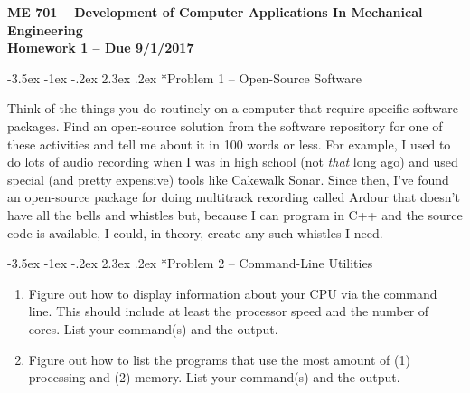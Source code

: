 \documentclass[11pt]{article}
\makeatletter
\renewcommand\section{\@startsection{section}{1}{\z@}%
                                  {-3.5ex \@plus -1ex \@minus -.2ex}%
                                  {2.3ex \@plus.2ex}%
                                  {\normalfont\bfseries}}
\makeatother
\begin{document}
{\large
  \begin{center}
    {\bf ME 701 -- Development of Computer Applications In Mechanical Engineering \\ 
         Homework 1 -- Due 9/1/2017}
  \end{center}
}
 

\section*{Problem 1 -- Open-Source Software}

Think of the things you do routinely on a computer that require 
specific software packages.  Find an 
open-source solution from the software repository  
for one of these activities and tell me about it in 100 words or less.
For example, I used to do lots of audio recording when I was in 
high school (not {\it that} long ago) and used special (and 
pretty expensive) tools like 
Cakewalk Sonar.  Since then, I've found an 
open-source package for doing multitrack 
recording called Ardour that doesn't have all the bells and 
whistles but, because I can program in C++ and the 
source code is available, I could, in theory,
create any such whistles I need.


\section*{Problem 2 -- Command-Line Utilities}

\begin{enumerate}
\item Figure out how to display information about your CPU via the 
      command line.  This should include at least the processor 
      speed and the number of cores.  List your command(s) and the output.
\item Figure out how to list the programs that use the most 
      amount of (1) processing and (2) memory.  List your command(s) 
      and the output.  
\end{enumerate}

 
\end{document}
